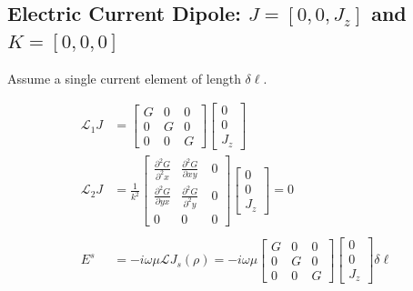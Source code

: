 \documentclass{article}
\newcommand{\0}{\varnothing}
\begin{document}
\newpage
\subsection{Electric Current Dipole: $J = [0,0,J_z]$ and $K = [0,0,0]$}

Assume a single current element of length $\delta \ell$. 

\begin{minipage}{0.5\textwidth}
\begin{align*}
    \mathcal{L}_1 J &= 
    \left[ \begin{array}{ccc} G & 0 & 0 \\ 
                            0 & G & 0\\ 
                            0 & 0 & G \end{array} \right]
        \left[ \begin{array}{c} 
        0 \\ 0 \\ J_z \end{array} \right]\\
    \mathcal{L}_2 J &= \frac{1}{k^2} \left[ \begin{array}{ccc} \frac{\partial^2 G }{\partial^2 x} & \frac{\partial^2 G }{\partial xy}\ & 0 \\ 
                            \frac{\partial^2 G}{\partial yx} & \frac{\partial^2 G}{\partial^2 y} &0\\ 
                            0 & 0 &0 \end{array} \right]
                                    \left[ \begin{array}{c} 
                            0 \\ 0 \\ J_z \end{array} \right] = 0\\
    \ \\
    E^s &= -i\omega\mu \mathcal{L} J_s(\rho) = -i\omega\mu \left[ \begin{array}{ccc} G & 0 & 0 \\ 
                            0 & G & 0\\ 
                            0 & 0 & G \end{array} \right]
        \left[ \begin{array}{c} 
        0 \\ 0 \\ J_z \end{array} \right] \delta \ell\\

\end{align*}
\end{minipage}
\end{document}
